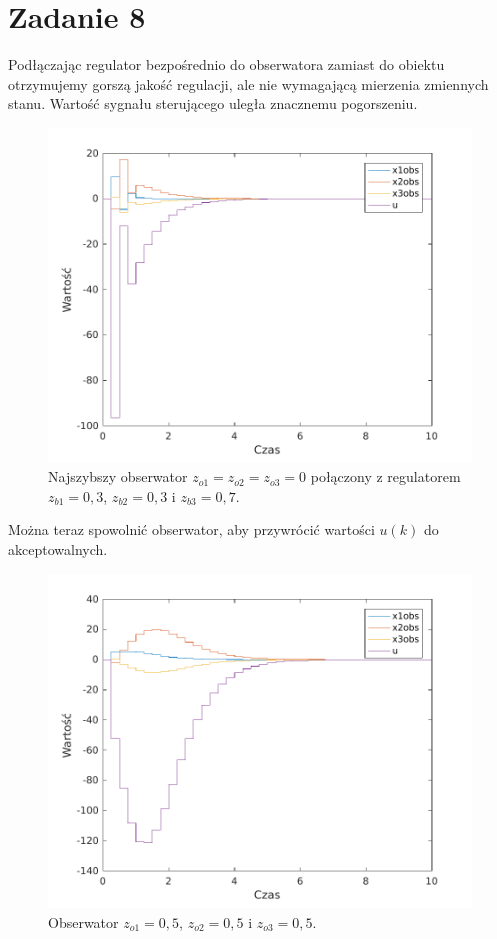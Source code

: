 \section{Zadanie 8}
Podłączając regulator bezpośrednio do obserwatora zamiast do obiektu otrzymujemy gorszą jakość regulacji, ale nie wymagającą mierzenia zmiennych stanu.
Wartość sygnału sterującego uległa znacznemu pogorszeniu.

\begin{figure}[H]
\centering
 \includegraphics[width=\textwidth]{img/obsreg1.pdf}
\caption{Najszybszy obserwator $z_{o1}=z_{o2}=z_{o3}=0$ połączony z regulatorem $z_{b1}=0,3$, $z_{b2}=0,3$ i $z_{b3}=0,7$.}
\end{figure}

Można teraz spowolnić obserwator, aby przywrócić wartości $u(k)$ do akceptowalnych.

\begin{figure}[H]
\centering
 \includegraphics[width=\textwidth]{img/obsreg2.pdf}
\caption{Obserwator $z_{o1}=0,5$, $z_{o2}=0,5$ i $z_{o3}=0,5$.}
\end{figure}

